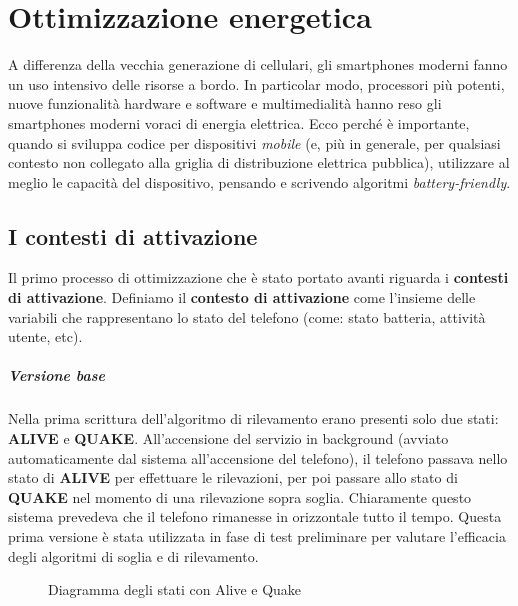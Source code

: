 \documentclass[a4paper,10pt]{memoir}
\begin{document}
\chapter{Ottimizzazione energetica}

A differenza della vecchia generazione di cellulari, gli smartphones moderni fanno un uso intensivo delle risorse a bordo. In particolar modo, processori più potenti, nuove funzionalità hardware e software e multimedialità hanno reso gli smartphones moderni voraci di energia elettrica. Ecco perché è importante, quando si sviluppa codice per dispositivi \textit{mobile} (e, più in generale, per qualsiasi contesto non collegato alla griglia di distribuzione elettrica pubblica), utilizzare al meglio le capacità del dispositivo, pensando e scrivendo algoritmi \textit{battery-friendly}.

\section{I contesti di attivazione}
\label{section:contesti}

Il primo processo di ottimizzazione che è stato portato avanti riguarda i \textbf{contesti di attivazione}. Definiamo il \textbf{contesto di attivazione} come l'insieme delle variabili che rappresentano lo stato del telefono (come: stato batteria, attività utente, etc).

\paragraph{Versione base} Nella prima scrittura dell'algoritmo di rilevamento erano presenti solo due stati: \textbf{ALIVE} e \textbf{QUAKE}. All'accensione del servizio in background (avviato automaticamente dal sistema all'accensione del telefono), il telefono passava nello stato di \textbf{ALIVE} per effettuare le rilevazioni, per poi passare allo stato di \textbf{QUAKE} nel momento di una rilevazione sopra soglia. Chiaramente questo sistema prevedeva che il telefono rimanesse in orizzontale tutto il tempo. Questa prima versione è stata utilizzata in fase di test preliminare per valutare l'efficacia degli algoritmi di soglia e di rilevamento.

\begin{figure}[ht]
\centering
\label{fig:scs_sm0}
\caption{Diagramma degli stati con Alive e Quake}
\end{figure}
\end{document}
